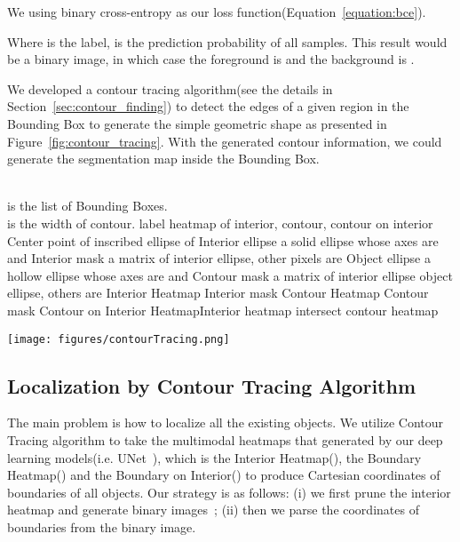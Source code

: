 \documentclass{article}
\begin{document}
{We using binary cross-entropy as our loss function(Equation~\ref{equation:bce}).



Where  is the label,  is the prediction probability of all  samples. This result would be a binary image, in which case the foreground is  and the background is .

We developed a contour tracing algorithm(see the details in Section~\ref{sec:contour_finding}) to detect the edges of a given region in the Bounding Box to generate the simple geometric shape as presented in Figure~\ref{fig:contour_tracing}.
With the generated contour information, we could generate the segmentation map inside the Bounding Box.




\begin{algorithm}
  \caption{Transfering Bounding Box Annotations to Multimodal Annotations\label{algo:multimodal}}
  \begin{algorithmic}[1]
     \Require
     \\
      is the list of Bounding Boxes.\\
      is the width of contour.
     \Ensure
     label heatmap of interior, contour, contour on interior 
        \State 
        \State Center point of inscribed ellipse  of  
        \State Interior ellipse  a solid ellipse whose axes are  and 
        \State Interior mask  a matrix of interior ellipse, other pixels are 
        \State Object ellipse  a hollow ellipse whose axes are  and 
        \State Contour mask  a matrix of interior ellipse  object ellipse, others are 
        \State Interior Heatmap Interior mask
        \State Contour Heatmap Contour mask
     \EndFor
     \State Contour on Interior HeatmapInterior heatmap intersect contour heatmap
  \end{algorithmic}
\end{algorithm}




\begin{figure*}[!ht]
  \centering
     \texttt{[image: figures/contourTracing.png]}\label{fig:contour_tracing}
  \caption{Contour Tracing Algorithm}
  \end{figure*}


\subsection{Localization by Contour Tracing Algorithm\label{sec:contour_finding}}
The main problem is how to localize all the existing objects. 
We utilize Contour Tracing algorithm to take the multimodal heatmaps that generated by our deep learning models(i.e. UNet~\cite{ronneberger2015u}), which is the Interior Heatmap(), the Boundary Heatmap() and the Boundary on Interior() to produce Cartesian coordinates of boundaries of all objects. Our strategy is as follows: (i) we first prune the interior heatmap and generate binary images~\cite{suzuki1985topological}; (ii) then we parse the coordinates of boundaries from the binary image.

}
\end{document}
